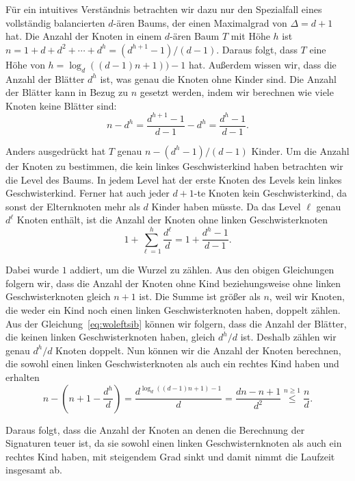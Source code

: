 Für ein intuitives Verständnis betrachten wir dazu nur den Spezialfall eines vollständig balancierten $d$\hyp ären Baums, der einen Maximalgrad von $\Delta = d + 1$ hat.
Die Anzahl der Knoten in einem $d$\hyp ären Baum $T$ mit Höhe $h$ ist $n = 1 + d + d^2 + \cdots + d^h = (d^{h+1} - 1)/(d - 1)$.
Daraus folgt, dass $T$ eine Höhe von $h = \log_d((d-1)n+1))-1$ hat.
Außerdem wissen wir, dass die Anzahl der Blätter $d^h$ ist, was genau die Knoten ohne Kinder sind.
Die Anzahl der Blätter kann in Bezug zu $n$ gesetzt werden, indem wir berechnen wie viele Knoten keine Blätter sind:
\begin{equation*}
    n - d^h = \frac{d^{h+1} - 1}{d - 1}  - d^h = \frac{d^h - 1}{d - 1}.
\end{equation*}

Anders ausgedrückt hat $T$ genau $n - (d^h - 1)/(d - 1)$ Kinder.
Um die Anzahl der Knoten zu bestimmen, die kein linkes Geschwisterkind haben betrachten wir die Level des Baums.
In jedem Level hat der erste Knoten des Levels kein linkes Geschwisterkind.
Ferner hat auch jeder $d+1$\hyp te Knoten kein Geschwisterkind, da sonst der Elternknoten mehr als $d$ Kinder haben müsste.
Da das Level $\ell$ genau $d^{\ell}$ Knoten enthält, ist die Anzahl der Knoten ohne linken Geschwisterknoten
\begin{equation}\label{eq:woleftsib}
    1 + \sum_{\ell=1}^{h} \frac{d^\ell}{d} = 1 + \frac{d^h - 1}{d - 1}.
\end{equation}

Dabei wurde $1$ addiert, um die Wurzel zu zählen.
Aus den obigen Gleichungen folgern wir, dass die Anzahl der Knoten ohne Kind beziehungsweise ohne linken Geschwisterknoten gleich $n + 1$ ist.
Die Summe ist größer als $n$, weil wir Knoten, die weder ein Kind noch einen linken Geschwisterknoten haben, doppelt zählen.
Aus der Gleichung~\eqref{eq:woleftsib} können wir folgern, dass die Anzahl der Blätter, die keinen linken Geschwisterknoten haben, gleich $d^h / d$ ist.
Deshalb zählen wir genau $d^h / d$ Knoten doppelt.
Nun können wir die Anzahl der Knoten berechnen, die sowohl einen linken Geschwisterknoten als auch ein rechtes Kind haben und erhalten
\begin{equation*}
    n - \left(n + 1 - \frac{d^h}{d}\right) = \frac{d^{\log_d((d-1)n + 1) - 1}}{d} = \frac{dn - n + 1}{d^2} \overset{n \geq 1}{\leq} \frac{n}{d}.
\end{equation*}

Daraus folgt, dass die Anzahl der Knoten an denen die Berechnung der Signaturen teuer ist, da sie sowohl einen linken Geschwisternknoten als auch ein rechtes Kind haben, mit steigendem Grad sinkt und damit nimmt die Laufzeit insgesamt ab.


